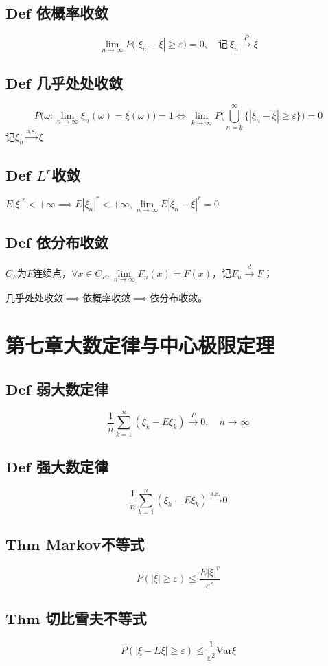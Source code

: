 \documentclass{article}
\begin{document}
	\subsection{$\bm{Def}$ 依概率收敛}
	\[
	\lim_{n\to\infty}P\big(|\xi_n-\xi|\ge\varepsilon\big)=0,\quad \text{记}\ \xi_n\stackrel{P}{\to}\xi
	\]
	\subsection{$\bm{Def}$ 几乎处处收敛}
	\[
	P\big(\omega:\lim_{n\to\infty}\xi_n(\omega)=\xi(\omega)\big)=1
	\iff \lim_{k\to\infty}P\Big(\bigcup_{n=k}^{\infty}\big\{|\xi_n-\xi|\ge\varepsilon\big\}\Big)=0
	\]
	记$\xi_n\xrightarrow{\text{a.s.}}\xi$
	\subsection{$\bm{Def}$ $L^r$收敛}
	$E|\xi|^r<+\infty\implies E|\xi_n|^r<+\infty,\lim\limits_{n\to\infty}E|\xi_n-\xi|^r=0$
	\subsection{$\bm{Def}$ 依分布收敛}
	$C_F$为$F$连续点，$\forall x\in C_F,\lim\limits_{n\to\infty}F_n(x)=F(x)$，记$F_n\stackrel{d}{\to}F$；
	
	\noindent 几乎处处收敛$\implies$依概率收敛$\implies$依分布收敛。
	
	\section{第七章\quad 大数定律与中心极限定理}
	\subsection{$\bm{Def}$ 弱大数定律}
	\[
	\frac1n\sum_{k=1}^n(\xi_k-E\xi_k)\stackrel{P}{\to}0,\quad n\to\infty
	\]
	\subsection{$\bm{Def}$ 强大数定律}
	\[
	\frac1n\sum_{k=1}^n(\xi_k-E\xi_k)\xrightarrow{\text{a.s.}}0
	\]
	
	\subsection{$\bm{Thm}$ Markov不等式}
	\[P(|\xi|\geq \varepsilon)\leq \dfrac{E|\xi|^r}{\varepsilon^r}\]
	
	\subsection{$\bm{Thm}$ 切比雪夫不等式}
	\[
	P(|\xi-E\xi|\ge\varepsilon)\le\frac1{\varepsilon^2}\mathrm{Var}\xi
	\]
\end{document}
